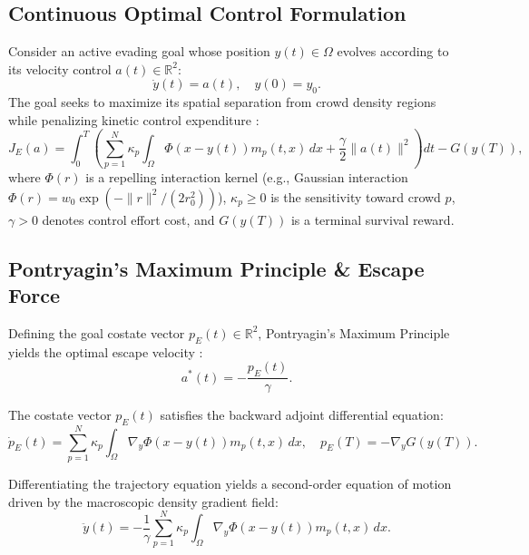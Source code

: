 \documentclass[11pt,a4paper]{article}
\begin{document}
\subsection{Continuous Optimal Control Formulation}
Consider an active evading goal whose position $y(t) \in \Omega$ evolves according to its velocity control $a(t) \in \mathbb{R}^2$:
\begin{equation}
\dot{y}(t) = a(t), \quad y(0) = y_0.
\end{equation}
The goal seeks to maximize its spatial separation from crowd density regions while penalizing kinetic control expenditure \cite{bergault2024mean, wan2021improved}:
\begin{equation}
\label{eq:goal_cost}
J_E(a) = \int_0^T \left( \sum_{p=1}^N \kappa_p \int_{\Omega} \Phi(x - y(t)) m_p(t, x) \, dx + \frac{\gamma}{2} \|a(t)\|^2 \right) dt - G(y(T)),
\end{equation}
where $\Phi(r)$ is a repelling interaction kernel (e.g., Gaussian interaction $\Phi(r) = w_0 \exp(-\|r\|^2 / (2 r_0^2))$), $\kappa_p \ge 0$ is the sensitivity toward crowd $p$, $\gamma > 0$ denotes control effort cost, and $G(y(T))$ is a terminal survival reward.

\subsection{Pontryagin's Maximum Principle \& Escape Force}
Defining the goal costate vector $p_E(t) \in \mathbb{R}^2$, Pontryagin's Maximum Principle yields the optimal escape velocity \cite{badakaya2022game}:
\begin{equation}
a^*(t) = -\frac{p_E(t)}{\gamma}.
\end{equation}

The costate vector $p_E(t)$ satisfies the backward adjoint differential equation:
\begin{equation}
\label{eq:costate}
\dot{p}_E(t) = \sum_{p=1}^N \kappa_p \int_{\Omega} \nabla_y \Phi(x - y(t)) m_p(t, x) \, dx, \quad p_E(T) = -\nabla_y G(y(T)).
\end{equation}

Differentiating the trajectory equation yields a second-order equation of motion driven by the macroscopic density gradient field:
\begin{equation}
\label{eq:goal_acceleration}
\ddot{y}(t) = -\frac{1}{\gamma} \sum_{p=1}^N \kappa_p \int_{\Omega} \nabla_y \Phi(x - y(t)) m_p(t, x) \, dx.
\end{equation}
\end{document}
